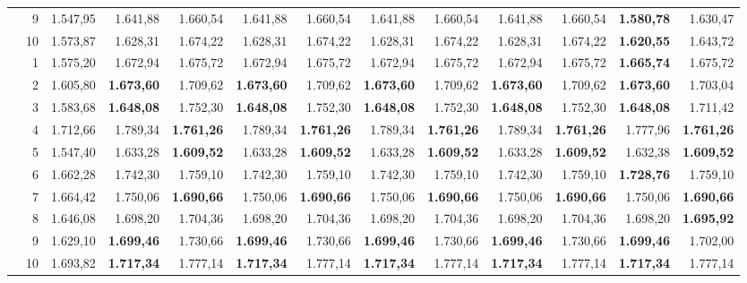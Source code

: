 \documentclass[11pt,a4paper]{article}
\begin{document}
\begin{table}[!htbp]
{\begin{tabular}{rrr rr rr rr rr rr}
 & 9 & 1.547{,}95 & 1.641{,}88 & 1.660{,}54 & 1.641{,}88 & 1.660{,}54 & 1.641{,}88 & 1.660{,}54 & 1.641{,}88 & 1.660{,}54 & \textbf{1.580{,}78} & 1.630{,}47 \\
 & 10 & 1.573{,}87 & 1.628{,}31 & 1.674{,}22 & 1.628{,}31 & 1.674{,}22 & 1.628{,}31 & 1.674{,}22 & 1.628{,}31 & 1.674{,}22 & \textbf{1.620{,}55} & 1.643{,}72 \\
\addlinespace
140 & 1 & 1.575{,}20 & 1.672{,}94 & 1.675{,}72 & 1.672{,}94 & 1.675{,}72 & 1.672{,}94 & 1.675{,}72 & 1.672{,}94 & 1.675{,}72 & \textbf{1.665{,}74} & 1.675{,}72 \\
 & 2 & 1.605{,}80 & \textbf{1.673{,}60} & 1.709{,}62 & \textbf{1.673{,}60} & 1.709{,}62 & \textbf{1.673{,}60} & 1.709{,}62 & \textbf{1.673{,}60} & 1.709{,}62 & \textbf{1.673{,}60} & 1.703{,}04 \\
 & 3 & 1.583{,}68 & \textbf{1.648{,}08} & 1.752{,}30 & \textbf{1.648{,}08} & 1.752{,}30 & \textbf{1.648{,}08} & 1.752{,}30 & \textbf{1.648{,}08} & 1.752{,}30 & \textbf{1.648{,}08} & 1.711{,}42 \\
 & 4 & 1.712{,}66 & 1.789{,}34 & \textbf{1.761{,}26} & 1.789{,}34 & \textbf{1.761{,}26} & 1.789{,}34 & \textbf{1.761{,}26} & 1.789{,}34 & \textbf{1.761{,}26} & 1.777{,}96 & \textbf{1.761{,}26} \\
 & 5 & 1.547{,}40 & 1.633{,}28 & \textbf{1.609{,}52} & 1.633{,}28 & \textbf{1.609{,}52} & 1.633{,}28 & \textbf{1.609{,}52} & 1.633{,}28 & \textbf{1.609{,}52} & 1.632{,}38 & \textbf{1.609{,}52} \\
 & 6 & 1.662{,}28 & 1.742{,}30 & 1.759{,}10 & 1.742{,}30 & 1.759{,}10 & 1.742{,}30 & 1.759{,}10 & 1.742{,}30 & 1.759{,}10 & \textbf{1.728{,}76} & 1.759{,}10 \\
 & 7 & 1.664{,}42 & 1.750{,}06 & \textbf{1.690{,}66} & 1.750{,}06 & \textbf{1.690{,}66} & 1.750{,}06 & \textbf{1.690{,}66} & 1.750{,}06 & \textbf{1.690{,}66} & 1.750{,}06 & \textbf{1.690{,}66} \\
 & 8 & 1.646{,}08 & 1.698{,}20 & 1.704{,}36 & 1.698{,}20 & 1.704{,}36 & 1.698{,}20 & 1.704{,}36 & 1.698{,}20 & 1.704{,}36 & 1.698{,}20 & \textbf{1.695{,}92} \\
 & 9 & 1.629{,}10 & \textbf{1.699{,}46} & 1.730{,}66 & \textbf{1.699{,}46} & 1.730{,}66 & \textbf{1.699{,}46} & 1.730{,}66 & \textbf{1.699{,}46} & 1.730{,}66 & \textbf{1.699{,}46} & 1.702{,}00 \\
 & 10 & 1.693{,}82 & \textbf{1.717{,}34} & 1.777{,}14 & \textbf{1.717{,}34} & 1.777{,}14 & \textbf{1.717{,}34} & 1.777{,}14 & \textbf{1.717{,}34} & 1.777{,}14 & \textbf{1.717{,}34} & 1.777{,}14 \\

\end{tabular}}
\end{table}
\end{document}
